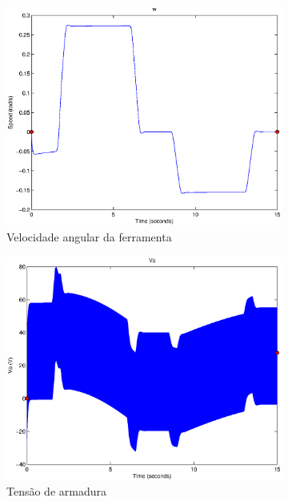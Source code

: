 \documentclass{article}
\begin{document}
\begin{figure}[H]
\begin{subfigure}{0.3\textwidth}
		\includegraphics[width=\linewidth]{matlab/w5}
		\caption{Velocidade angular da ferramenta}
	\end{subfigure}
	\begin{subfigure}{0.3\textwidth}
		\includegraphics[width=\linewidth]{matlab/va5}
		\caption{Tensão de armadura}
	\end{subfigure}
	\begin{subfigure}{0.3\textwidth}

\end{subfigure}
\end{figure}
\end{document}
